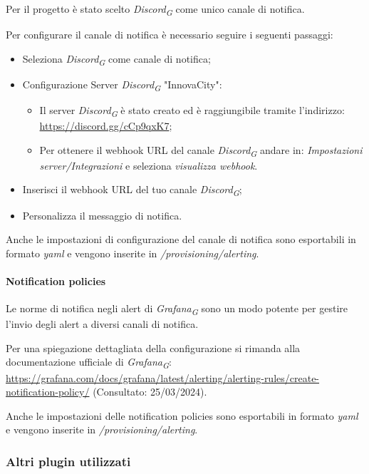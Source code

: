 Per il progetto è stato scelto \textit{Discord}\textsubscript{\textit{G}} come unico canale di notifica.

Per configurare il canale di notifica è necessario seguire i seguenti passaggi:
\begin{itemize}
    \item Seleziona \textit{Discord}\textsubscript{\textit{G}} come canale di notifica;
    \item Configurazione Server \textit{Discord}\textsubscript{\textit{G}} "InnovaCity":
    \begin{itemize}
        \item Il server \textit{Discord}\textsubscript{\textit{G}} è stato creato ed è raggiungibile tramite l'indirizzo: \url{https://discord.gg/cCp9qxK7};
        \item Per ottenere il webhook URL del canale \textit{Discord}\textsubscript{\textit{G}} andare in: \textit{Impostazioni server/Integrazioni} e seleziona \textit{visualizza webhook}.
    \end{itemize}
    \item Inserisci il webhook URL del tuo canale \textit{Discord}\textsubscript{\textit{G}};
    \item Personalizza il messaggio di notifica.
    
\end{itemize}

Anche le impostazioni di configurazione del canale di notifica sono esportabili in formato \textit{yaml} e vengono inserite in \textit{/provisioning/alerting}.



\paragraph{Notification policies}
Le norme di notifica negli alert di \textit{Grafana}\textsubscript{\textit{G}} sono un modo potente per gestire l'invio degli alert a diversi canali di notifica.

Per una spiegazione dettagliata della configurazione si rimanda alla documentazione ufficiale di \textit{Grafana}\textsubscript{\textit{G}}: \url{https://grafana.com/docs/grafana/latest/alerting/alerting-rules/create-notification-policy/} (Consultato: 25/03/2024).

Anche le impostazioni delle notification policies sono esportabili in formato \textit{yaml} e vengono inserite in \textit{/provisioning/alerting}.

\subsubsection{Altri plugin utilizzati}
